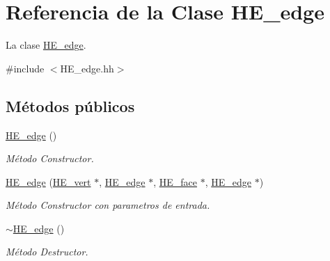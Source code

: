 \hypertarget{class_h_e__edge}{\section{Referencia de la Clase H\-E\-\_\-edge}
\label{class_h_e__edge}
}


La clase \hyperlink{class_h_e__edge}{H\-E\-\_\-edge}.  




{\ttfamily \#include $<$H\-E\-\_\-edge.\-hh$>$}

\subsection*{Métodos públicos}
\begin{DoxyCompactItemize}
\item 
\hyperlink{class_h_e__edge_afbd057f4aae8455be8915d37a6d68abc}{H\-E\-\_\-edge} ()
\begin{DoxyCompactList}\small\item\em Método Constructor. \end{DoxyCompactList}\item 
\hyperlink{class_h_e__edge_a06abe32cf6548c2893b2be8a31a442b2}{H\-E\-\_\-edge} (\hyperlink{class_h_e__vert}{H\-E\-\_\-vert} $\ast$, \hyperlink{class_h_e__edge}{H\-E\-\_\-edge} $\ast$, \hyperlink{class_h_e__face}{H\-E\-\_\-face} $\ast$, \hyperlink{class_h_e__edge}{H\-E\-\_\-edge} $\ast$)
\begin{DoxyCompactList}\small\item\em Método Constructor con parametros de entrada. \end{DoxyCompactList}\item 
\hypertarget{class_h_e__edge_a1eeb049d48d330dccd705d95e19f72d6}{\hyperlink{class_h_e__edge_a1eeb049d48d330dccd705d95e19f72d6}{$\sim$\-H\-E\-\_\-edge} ()}\label{class_h_e__edge_a1eeb049d48d330dccd705d95e19f72d6}

\begin{DoxyCompactList}\small\item\em Método Destructor. \end{DoxyCompactList}\end{DoxyCompactItemize}
